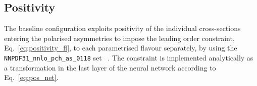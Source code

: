 \subsection*{Positivity}

The baseline configuration exploits positivity of the individual cross-sections entering the polarised asymmetries to impose the leading order constraint, Eq.~\eqref{eq:positivity_fl}, to each parametrised flavour separately, by using the \texttt{NNPDF31\_nnlo\_pch\_as\_0118} set ~\cite{NNPDF:2017mvq}. The constraint is implemented analytically as a transformation in the last layer of the neural network according to Eq.~\eqref{eq:pos_net}.%

